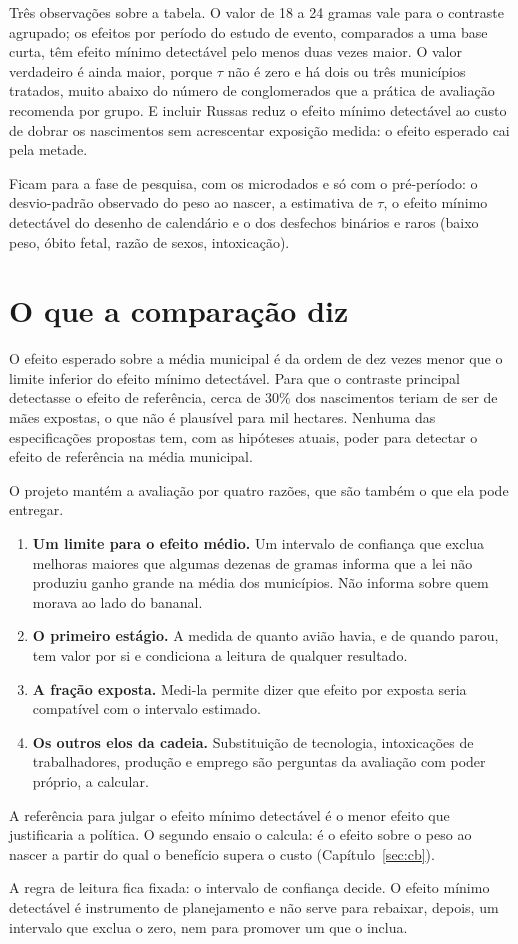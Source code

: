Três observações sobre a tabela. O valor de 18 a 24 gramas vale para o contraste
agrupado; os efeitos por período do estudo de evento, comparados a uma base
curta, têm efeito mínimo detectável pelo menos duas vezes maior. O valor
verdadeiro é ainda maior, porque $\tau$ não é zero e há dois ou três municípios
tratados, muito abaixo do número de conglomerados que a prática de avaliação
recomenda por grupo. E incluir Russas reduz o efeito mínimo detectável ao custo
de dobrar os nascimentos sem acrescentar exposição medida: o efeito esperado
cai pela metade.

Ficam para a fase de pesquisa, com os microdados e só com o pré-período: o
desvio-padrão observado do peso ao nascer, a estimativa de $\tau$, o efeito
mínimo detectável do desenho de calendário e o dos desfechos binários e raros
(baixo peso, óbito fetal, razão de sexos, intoxicação).

\section{O que a comparação diz}

O efeito esperado sobre a média municipal é da ordem de dez vezes menor que o
limite inferior do efeito mínimo detectável. Para que o contraste principal
detectasse o efeito de referência, cerca de 30\% dos nascimentos teriam de ser
de mães expostas, o que não é plausível para mil hectares. Nenhuma das
especificações propostas tem, com as hipóteses atuais, poder para detectar o
efeito de referência na média municipal.

O projeto mantém a avaliação por quatro razões, que são também o que ela pode
entregar.

\begin{enumerate}
\item \textbf{Um limite para o efeito médio.} Um intervalo de confiança que
exclua melhoras maiores que algumas dezenas de gramas informa que a lei não
produziu ganho grande na média dos municípios. Não informa sobre quem morava ao
lado do bananal.
\item \textbf{O primeiro estágio.} A medida de quanto avião havia, e de quando
parou, tem valor por si e condiciona a leitura de qualquer resultado.
\item \textbf{A fração exposta.} Medi-la permite dizer que efeito por exposta
seria compatível com o intervalo estimado.
\item \textbf{Os outros elos da cadeia.} Substituição de tecnologia,
intoxicações de trabalhadores, produção e emprego são perguntas da avaliação
com poder próprio, a calcular.
\end{enumerate}

A referência para julgar o efeito mínimo detectável é o menor efeito que
justificaria a política. O segundo ensaio o calcula: é o efeito sobre o peso ao
nascer a partir do qual o benefício supera o custo
(Capítulo~\ref{sec:cb}).

A regra de leitura fica fixada: o intervalo de confiança decide. O efeito mínimo
detectável é instrumento de planejamento e não serve para rebaixar, depois, um
intervalo que exclua o zero, nem para promover um que o inclua.
